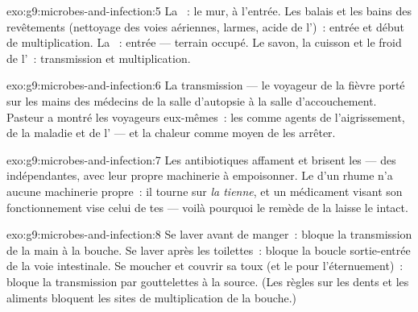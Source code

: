 \begin{solution}{exo:g9:microbes-and-infection:5}
La ~: le mur, à l'entrée. Les balais et les bains des
revêtements (nettoyage des voies aériennes, larmes, acide de
l')~: entrée et début de multiplication. La ~: entrée --- terrain occupé. Le savon, la cuisson
et le froid de l'~: transmission et multiplication.
\end{solution}

\begin{solution}{exo:g9:microbes-and-infection:6}
La transmission --- le voyageur de la fièvre porté sur les
mains des médecins de la salle d'autopsie à la salle
d'accouchement. Pasteur a montré les voyageurs eux-mêmes~:
les  comme agents de l'aigrissement, de la maladie
et de l' --- et la chaleur comme moyen de les
arrêter.
\end{solution}

\begin{solution}{exo:g9:microbes-and-infection:7}
Les antibiotiques affament et brisent les  --- des
 indépendantes, avec leur propre machinerie à
empoisonner. Le  d'un rhume n'a aucune machinerie
propre~: il tourne sur \emph{la tienne}, et un médicament
visant son fonctionnement vise celui de tes  ---
voilà pourquoi le remède de la  laisse le 
intact.
\end{solution}

\begin{solution}{exo:g9:microbes-and-infection:8}
Se laver avant de manger~: bloque la transmission de la
main à la bouche. Se laver après les toilettes~: bloque la
boucle sortie-entrée de la voie intestinale. Se moucher et
couvrir sa toux (et le  pour l'éternuement)~: bloque la
transmission par gouttelettes à la source. (Les règles sur
les dents et les aliments bloquent les sites de
multiplication de la bouche.)
\end{solution}

